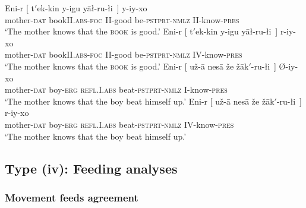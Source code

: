 \documentclass[output=paper
,modfonts
,nonflat]{langsci/langscibook}
\begin{document}
	\ea\label{ex:mueller:8}
	\ea{\label{ex:mueller:8a}}
		\gll   *Eni-r [ t$'$ek-kin y-igu y\={a}\l -ru-\l i~] y-iy-xo\\
		mother-{\scshape dat} {} bookII.{\scshape abs}-{\scshape foc} II-good be-{\scshape pstprt-nmlz} II-know-{\scshape pres}\\
		\glt   `The mother knows that the {\scshape book} \rm is good.'
	\ex{\label{ex:mueller:8b}}
		\gll Eni-r [ t$'$ek-kin y-igu y\={a}\l -ru-\l i~] r-iy-xo\\
		mother-{\scshape dat} {} bookII.{\scshape abs}-{\scshape foc} II-good be-{\scshape  pstprt-nmlz} IV-know-{\scshape pres}\\
		\glt `The mother knows that the {\scshape book} \rm is good.'
	\ex{\label{ex:mueller:8c}}
		\gll *Eni-r [ u\v{z}-\={a} {nes\={a} \v{z}e}  \v{z}\={a}k$'$-ru-\l i~] {} {\O}-iy-xo \\
		mother-{\scshape dat} {} boy-{\scshape erg} {\scshape refl}.I.{\scshape abs} beat-{\scshape  pstprt-nmlz} {} I-know-{\scshape pres}\\
		\glt `The mother knows that the boy beat himself up.'
	\ex{\label{ex:mueller:8d}}
		\gll Eni-r [ u\v{z}-\={a} {nes\={a} \v{z}e} \v{z}\={a}k$'$-ru-\l i~] r-iy-xo \\
		mother-{\scshape dat} {} boy-{\scshape erg} {\scshape refl}.I.{\scshape abs} beat-{\scshape pstprt-nmlz} IV-know-{\scshape pres}\\ \vspace{-0.9cm}
		\glt `The mother knows that the boy beat himself up.'
	\z
	\z
	
	\subsection{Type (iv): Feeding analyses} \label{sec-bjoe-muel:2.4}
	
	\subsubsection{Movement feeds agreement}
	
\end{document}
